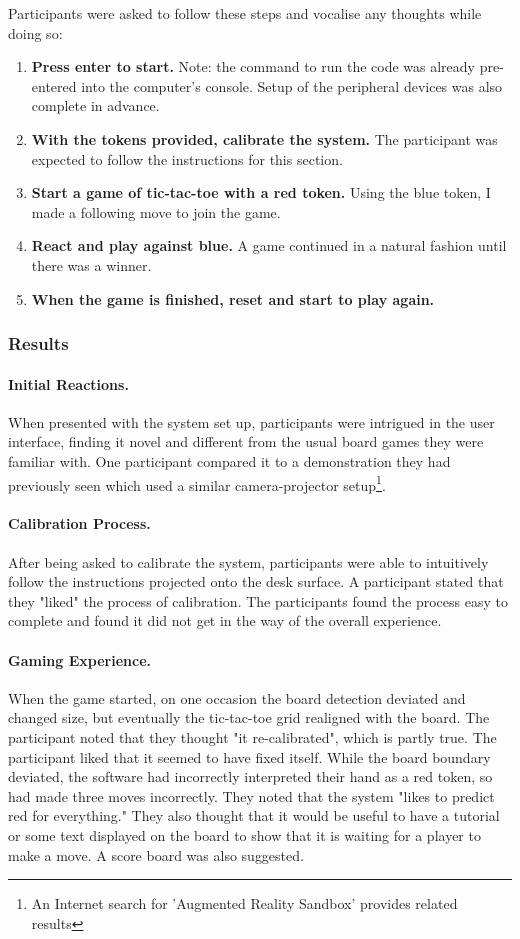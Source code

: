 \documentclass[12pt]{article}
\begin{document}
Participants were asked to follow these steps and vocalise any thoughts while doing so:
\begin{enumerate}
    \item \textbf{Press enter to start.} Note: the command to run the code was already pre-entered into the computer's console. Setup of the peripheral devices was also complete in advance. 
    \item \textbf{With the tokens provided, calibrate the system.} The participant was expected to follow the instructions for this section.
    \item \textbf{Start a game of tic-tac-toe with a red token.} Using the blue token, I made a following move to join the game.
    \item \textbf{React and play against blue.} A game continued in a natural fashion until there was a winner. 
    \item \textbf{When the game is finished, reset and start to play again.}
\end{enumerate}

\subsubsection{Results}
\paragraph{Initial Reactions.} When presented with the system set up, participants were intrigued in the user interface, finding it novel and different from the usual board games they were familiar with. 
One participant compared it to a demonstration they had previously seen which used a similar camera-projector setup\footnote{An Internet search for 'Augmented Reality Sandbox' provides related results}.

\paragraph{Calibration Process.} After being asked to calibrate the system, participants were able to intuitively follow the instructions projected onto the desk surface. 
A participant stated that they "liked" the process of calibration. 
The participants found the process easy to complete and found it did not get in the way of the overall experience. 

\paragraph{Gaming Experience.} When the game started, on one occasion the board detection deviated and changed size, but eventually the tic-tac-toe grid realigned with the board. The participant noted that they thought "it re-calibrated", which is partly true. The participant liked that it seemed to have fixed itself. While the board boundary deviated, the software had incorrectly interpreted their hand as a red token, so had made three moves incorrectly. They noted that the system "likes to predict red for everything." They also thought that it would be useful to have a tutorial or some text displayed on the board to show that it is waiting for a player to make a move. A score board was also suggested.
\end{document}
